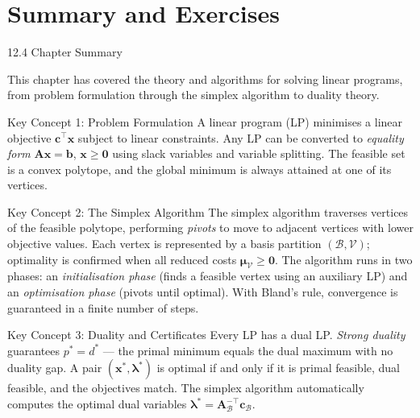 \documentclass[aspectratio=169,10pt]{beamer}
\newcommand{\xv}{\mathbf{x}}
\newcommand{\cv}{\mathbf{c}}
\newcommand{\bv}{\mathbf{b}}
\newcommand{\Av}{\mathbf{A}}
\newcommand{\muv}{\boldsymbol{\mu}}
\newcommand{\lav}{\boldsymbol{\lambda}}
\newcommand{\calB}{\mathcal{B}}
\newcommand{\calV}{\mathcal{V}}
\begin{document}
\section{Summary and Exercises}

\begin{frame}[allowframebreaks]{12.4 Chapter Summary}

This chapter has covered the theory and algorithms for solving linear programs,
from problem formulation through the simplex algorithm to duality theory.

\begin{block}{Key Concept 1: Problem Formulation}
A linear program (LP) minimises a linear objective $\cv^\top\xv$ subject to linear
constraints.  Any LP can be converted to \emph{equality form}
$\Av\xv = \bv$, $\xv \ge \mathbf{0}$ using slack variables and variable splitting.
The feasible set is a convex polytope, and the global minimum is always attained at
one of its vertices.
\end{block}

\begin{block}{Key Concept 2: The Simplex Algorithm}
The simplex algorithm traverses vertices of the feasible polytope, performing
\emph{pivots} to move to adjacent vertices with lower objective values.
Each vertex is represented by a basis partition $(\calB, \calV)$; optimality is
confirmed when all reduced costs $\muv_\calV \ge \mathbf{0}$.
The algorithm runs in two phases: an \emph{initialisation phase} (finds a feasible
vertex using an auxiliary LP) and an \emph{optimisation phase} (pivots until optimal).
With Bland's rule, convergence is guaranteed in a finite number of steps.
\end{block}

\begin{block}{Key Concept 3: Duality and Certificates}
Every LP has a dual LP.  \emph{Strong duality} guarantees $p^* = d^*$ --- the
primal minimum equals the dual maximum with no duality gap.  A pair
$(\xv^*, \lav^*)$ is optimal if and only if it is primal feasible, dual feasible,
and the objectives match.  The simplex algorithm automatically computes the optimal
dual variables $\lav^* = \Av_\calB^{-\top}\cv_\calB$.
\end{block}

\framebreak


\end{frame}
\end{document}
